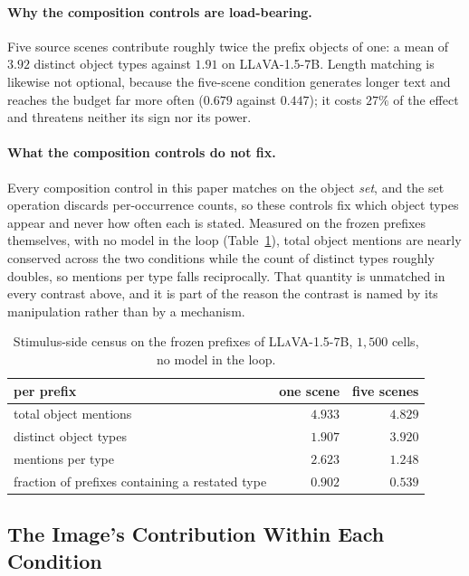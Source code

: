 \paragraph{Why the composition controls are load-bearing.} Five source scenes contribute roughly
twice the prefix objects of one: a mean of $3.92$ distinct object types against $1.91$ on \textsc{LLaVA-1.5-7B}. Length matching is likewise not optional, because the five-scene condition generates
longer text and reaches the budget far more often ($0.679$ against $0.447$); it costs
$27\%$ of the effect and threatens neither its sign nor its power.

\paragraph{What the composition controls do not fix.} Every composition control in this paper matches
on the object \emph{set}, and the set operation discards per-occurrence counts, so these controls fix
which object types appear and never how often each is stated. Measured on the frozen prefixes
themselves, with no model in the loop (Table~\ref{tab:census}), total object mentions are nearly
conserved across the two conditions while the count of distinct types roughly doubles, so mentions
per type falls reciprocally. That quantity is unmatched in every contrast above, and it is part of
the reason the contrast is named by its manipulation rather than by a mechanism.

\begin{table}[htb]
\caption{Stimulus-side census on the frozen prefixes of \textsc{LLaVA-1.5-7B}, $1{,}500$ cells, no
model in the loop.}
\label{tab:census}
\begin{center}
\small
\begin{tabular}{lrr}
\toprule
per prefix & one scene & five scenes \\
\midrule
total object mentions & $4.933$ & $4.829$ \\
distinct object types & $1.907$ & $3.920$ \\
mentions per type & $2.623$ & $1.248$ \\
fraction of prefixes containing a restated type & $0.902$ & $0.539$ \\
\bottomrule
\end{tabular}
\end{center}
\end{table}

\subsection{The Image's Contribution Within Each Condition}
\label{app:withincond}

